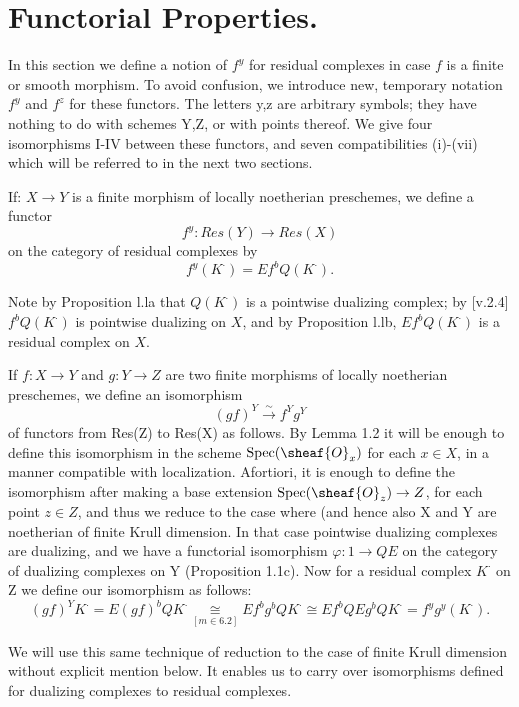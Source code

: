 \documentclass[12pt]{book}
\DeclareMathOperator{\Spec}{Spec}
\begin{document}
\setcounter{page}{311}
\section{Functorial Properties.}

In this section we define a notion of \(f^{y}\) for residual complexes in case \(f\) is a finite or smooth morphism. To avoid confusion, we introduce new, temporary notation \(f^{y}\) and \(f^{z}\) for these functors. The letters y,z are arbitrary symbols; they have nothing to do with schemes Y,Z, or with points thereof. We give four isomorphisms I-IV between these functors, and seven compatibilities (i)-(vii) which will be referred to in the next two sections.

If: \(X \to Y\) is a finite morphism of locally noetherian preschemes, we define a functor
\[f^{y}: Res(Y) \to Res(X)\]
on the category of residual complexes by
\[f^{y}\left(K^{\cdot}\right)=E f^{b} Q\left(K^{\cdot}\right) .\]

Note by Proposition l.la that \(Q(K^{\cdot})\) is a pointwise dualizing complex; by [v.2.4] \(f^{b} Q(K^{\cdot})\) is pointwise dualizing on \(X\), and by Proposition l.lb, \(Ef^{b} Q(K^{\cdot})\) is a residual complex on \(X\).

\setcounter{page}{312}
If \(f: X \to Y\) and \(g: Y \to Z\) are two finite morphisms of locally noetherian preschemes, we define an isomorphism
\[(g f)^{Y} \stackrel{\sim}{\to} f^{Y} g^{Y} \tag{I}\]
of functors from Res(Z) to Res(X) as follows. By Lemma 1.2 it will be enough to define this isomorphism in the scheme \(\Spec(\sheaf{O}_{x})\) for each \(x \in X\), in a manner compatible with localization. Afortiori, it is enough to define the isomorphism after making a base extension \(\Spec(\sheaf{O}_{z}) \to Z\), for each point \(z \in Z\), and thus we reduce to the case where (and hence also X and Y are noetherian of finite Krull dimension. In that case pointwise dualizing complexes are dualizing, and we have a functorial isomorphism \(\varphi: 1 \to Q E\) on the category of dualizing complexes on Y (Proposition 1.1c). Now for a residual complex \(K^{\cdot}\) on Z we define our isomorphism as follows:
\[(g f)^{Y} K^{\cdot}=E(g f)^{b} Q K^{\cdot} \underset{[m \in 6.2]}{\cong} E f^{b} g^{b} Q K^{\cdot} \cong E f^{b} Q E g^{b} Q K^{\cdot}=f^{y} g^{y}\left(K^{\cdot}\right) .\]

We will use this same technique of reduction to the case of finite Krull dimension without explicit mention below. It enables us to carry over isomorphisms defined for dualizing complexes to residual complexes.
\end{document}
